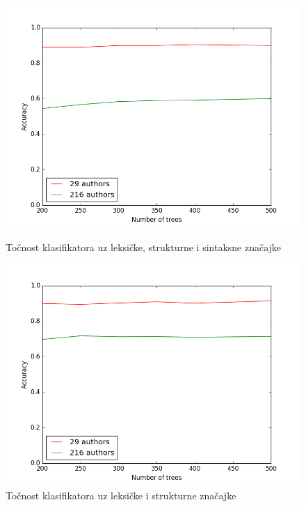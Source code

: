 \begin{figure}[H]
  \centering
  \begin{minipage}[b]{0.49\textwidth}
    \includegraphics[width=\textwidth]{fig/sve_znacajke_bez_fs.png}
    \caption{Točnost klasifikatora uz leksičke, strukturne i sintaksne značajke}
    \label{sve_znacajke}
  \end{minipage}
  \hfill
  \begin{minipage}[b]{0.49\textwidth} 
    \includegraphics[width=\textwidth]{fig/leksicke_bez_fs.png}
    \caption{Točnost klasifikatora uz leksičke i strukturne značajke}
    \label{leks_znacajke}
  \end{minipage}
\end{figure}

